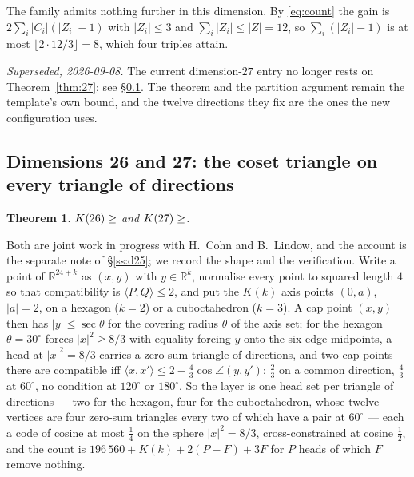 \documentclass[11pt]{amsart}
\newtheorem{theorem}{Theorem}[section]
\theoremstyle{remark}
\newcommand{\ip}[2]{\langle #1,#2\rangle}
\newcommand{\R}{\mathbb{R}}
\begin{document}
The family admits nothing further in this dimension. By \eqref{eq:count} the gain
is $2\sum_i|C_i|(|Z_i|-1)$ with $|Z_i|\le3$ and $\sum_i|Z_i|\le|Z|=12$, so
$\sum_i(|Z_i|-1)$ is at most $\lfloor 2\cdot12/3\rfloor=8$, which four triples
attain.

\emph{Superseded, 2026-09-08.} The current dimension-$27$ entry no
longer rests on Theorem~\ref{thm:27}; see \S\ref{ss:d2627}. The theorem and
the partition argument remain the template's own bound, and the twelve
directions they fix are the ones the new configuration uses.

\subsection{Dimensions 26 and 27: the coset triangle on every triangle of
directions}\label{ss:d2627}

\begin{theorem}\label{thm:2627}
$K(26)\ge\Kh{26}$ and $K(27)\ge\Kh{27}$.
\end{theorem}

Both are joint work in progress with H.~Cohn and B.~Lindow, and the account is
the separate note of \S\ref{ss:d25}; we record the shape and the verification.
Write a point of $\R^{24+k}$ as $(x,y)$ with $y\in\R^{k}$, normalise every point
to squared length $4$ so that compatibility is $\ip{P}{Q}\le2$, and put the
$K(k)$ axis points $(0,a)$, $|a|=2$, on a hexagon ($k=2$) or a cuboctahedron
($k=3$). A cap point $(x,y)$ then has $|y|\le\sec\theta$ for the covering radius
$\theta$ of the axis set; for the hexagon $\theta=30^{\circ}$ forces $|x|^{2}\ge8/3$
with equality forcing $y$ onto the six edge midpoints, a head at $|x|^{2}=8/3$
carries a zero-sum triangle of directions, and two cap points there are
compatible iff $\ip{x}{x'}\le2-\tfrac43\cos\angle(y,y')$: $\tfrac23$ on a common
direction, $\tfrac43$ at $60^{\circ}$, no condition at $120^{\circ}$ or $180^{\circ}$.
So the layer is one head set per triangle of directions --- two for the hexagon,
four for the cuboctahedron, whose twelve vertices are four zero-sum triangles
every two of which have a pair at $60^{\circ}$ --- each a code of cosine at most
$\tfrac14$ on the sphere $|x|^{2}=8/3$, cross-constrained at cosine $\tfrac12$, and
the count is $196\,560+K(k)+2(P-F)+3F$ for $P$ heads of which $F$ remove nothing.
\end{document}
